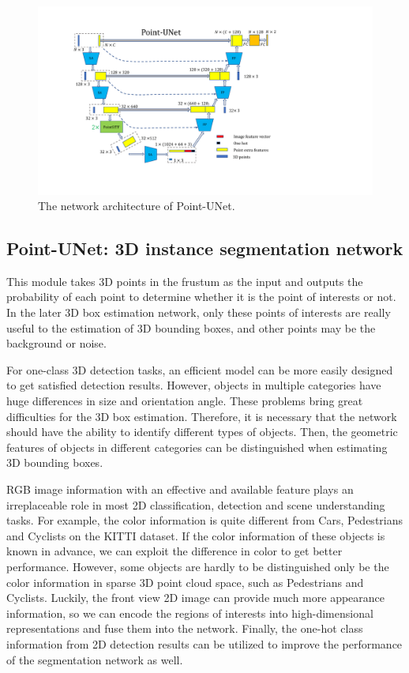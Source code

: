 \documentclass[letterpaper]{article}
\begin{document}
\begin{figure}[t]
\begin{center}
  \includegraphics[width=0.95\linewidth]{3D_UNET_ok.pdf}
\caption{The network architecture of Point-UNet.}
\end{center}
\end{figure}

\subsection{Point-UNet: 3D instance segmentation network}
This module takes 3D points in the frustum as the input and outputs the probability of each point to determine whether it is the point of interests or not. In the later 3D box estimation network, only these points of interests are really useful to the estimation of 3D bounding boxes, and other points may be the background or noise.

For one-class 3D detection tasks, an efficient model can be more easily designed to get satisfied detection results. However, objects in multiple categories have huge differences in size and orientation angle. These problems bring great difficulties for the 3D box estimation. Therefore, it is necessary that the network should have the ability to identify different types of objects. Then, the geometric features of objects in different categories can be distinguished when estimating 3D bounding boxes.

RGB image information with an effective and available feature plays an irreplaceable role in most 2D classification, detection and scene understanding tasks. For example, the color information is quite different from Cars, Pedestrians and Cyclists on the KITTI dataset. If the color information of these objects is known in advance, we can exploit the difference in color to get better performance. However, some objects are hardly to be distinguished only be the color information in sparse 3D point cloud space, such as Pedestrians and Cyclists. Luckily, the front view 2D image can provide much more appearance information, so we can encode the regions of interests into high-dimensional representations and fuse them into the network. Finally, the one-hot class information from 2D detection results can be utilized to improve the performance of the segmentation network as well.
\end{document}
